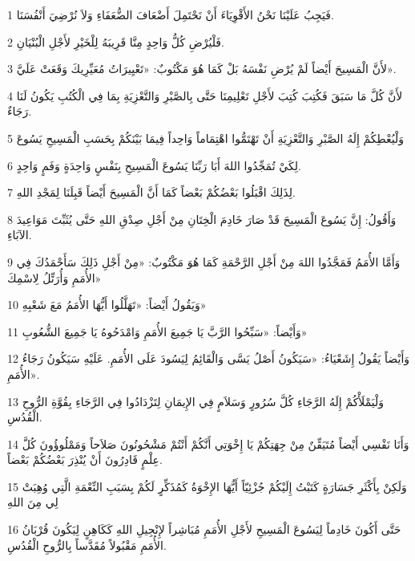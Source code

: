 \par 1 فَيَجِبُ عَلَيْنَا نَحْنُ الأَقْوِيَاءَ أَنْ نَحْتَمِلَ أَضْعَافَ الضُّعَفَاءِ وَلاَ نُرْضِيَ أَنْفُسَنَا.
\par 2 فَلْيُرْضِ كُلُّ وَاحِدٍ مِنَّا قَرِيبَهُ لِلْخَيْرِ لأَجْلِ الْبُنْيَانِ.
\par 3 لأَنَّ الْمَسِيحَ أَيْضاً لَمْ يُرْضِ نَفْسَهُ بَلْ كَمَا هُوَ مَكْتُوبٌ: «تَعْيِيرَاتُ مُعَيِّرِيكَ وَقَعَتْ عَلَيَّ».
\par 4 لأَنَّ كُلَّ مَا سَبَقَ فَكُتِبَ كُتِبَ لأَجْلِ تَعْلِيمِنَا حَتَّى بِالصَّبْرِ وَالتَّعْزِيَةِ بِمَا فِي الْكُتُبِ يَكُونُ لَنَا رَجَاءٌ.
\par 5 وَلْيُعْطِكُمْ إِلَهُ الصَّبْرِ وَالتَّعْزِيَةِ أَنْ تَهْتَمُّوا اهْتِمَاماً وَاحِداً فِيمَا بَيْنَكُمْ بِحَسَبِ الْمَسِيحِ يَسُوعَ
\par 6 لِكَيْ تُمَجِّدُوا اللهَ أَبَا رَبِّنَا يَسُوعَ الْمَسِيحِ بِنَفْسٍ وَاحِدَةٍ وَفَمٍ وَاحِدٍ.
\par 7 لِذَلِكَ اقْبَلُوا بَعْضُكُمْ بَعْضاً كَمَا أَنَّ الْمَسِيحَ أَيْضاً قَبِلَنَا لِمَجْدِ اللهِ.
\par 8 وَأَقُولُ: إِنَّ يَسُوعَ الْمَسِيحَ قَدْ صَارَ خَادِمَ الْخِتَانِ مِنْ أَجْلِ صِدْقِ اللهِ حَتَّى يُثَبِّتَ مَوَاعِيدَ الآبَاءِ.
\par 9 وَأَمَّا الأُمَمُ فَمَجَّدُوا اللهَ مِنْ أَجْلِ الرَّحْمَةِ كَمَا هُوَ مَكْتُوبٌ: «مِنْ أَجْلِ ذَلِكَ سَأَحْمَدُكَ فِي الأُمَمِ وَأُرَتِّلُ لِاسْمِكَ»
\par 10 وَيَقُولُ أَيْضاً: «تَهَلَّلُوا أَيُّهَا الأُمَمُ مَعَ شَعْبِهِ»
\par 11 وَأَيْضاً: «سَبِّحُوا الرَّبَّ يَا جَمِيعَ الأُمَمِ وَامْدَحُوهُ يَا جَمِيعَ الشُّعُوبِ»
\par 12 وَأَيْضاً يَقُولُ إِشَعْيَاءُ: «سَيَكُونُ أَصْلُ يَسَّى وَالْقَائِمُ لِيَسُودَ عَلَى الأُمَمِ. عَلَيْهِ سَيَكُونُ رَجَاءُ الأُمَمِ».
\par 13 وَلْيَمْلَأْكُمْ إِلَهُ الرَّجَاءِ كُلَّ سُرُورٍ وَسَلاَمٍ فِي الإِيمَانِ لِتَزْدَادُوا فِي الرَّجَاءِ بِقُوَّةِ الرُّوحِ الْقُدُسِ.
\par 14 وَأَنَا نَفْسِي أَيْضاً مُتَيَقِّنٌ مِنْ جِهَتِكُمْ يَا إِخْوَتِي أَنَّكُمْ أَنْتُمْ مَشْحُونُونَ صَلاَحاً وَمَمْلُوؤُونَ كُلَّ عِلْمٍ قَادِرُونَ أَنْ يُنْذِرَ بَعْضُكُمْ بَعْضاً.
\par 15 وَلَكِنْ بِأَكْثَرِ جَسَارَةٍ كَتَبْتُ إِلَيْكُمْ جُزْئِيّاً أَيُّهَا الإِخْوَةُ كَمُذَكِّرٍ لَكُمْ بِسَبَبِ النِّعْمَةِ الَّتِي وُهِبَتْ لِي مِنَ اللهِ
\par 16 حَتَّى أَكُونَ خَادِماً لِيَسُوعَ الْمَسِيحِ لأَجْلِ الأُمَمِ مُبَاشِراً لإِنْجِيلِ اللهِ كَكَاهِنٍ لِيَكُونَ قُرْبَانُ الأُمَمِ مَقْبُولاً مُقَدَّساً بِالرُّوحِ الْقُدُسِ.
